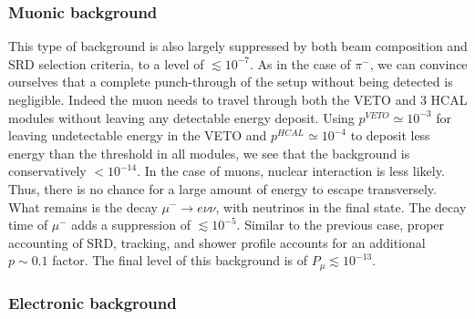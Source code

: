 \subsubsection{Muonic background}
\label{ch3:sec:bkg:inv:muon}

This type of background is also largely suppressed by both beam composition and SRD selection criteria, to a level of
$\lesssim 10^{-7}$. As in the case of $\pi^-$, we can convince ourselves that a complete punch-through of the setup without being detected is negligible. Indeed the muon needs to travel through both the VETO and 3 HCAL modules without leaving any detectable energy deposit. Using $p^{VETO} \simeq 10^{-3}$ for leaving undetectable energy in the VETO and $p^{HCAL} \simeq 10^{-4}$ to deposit less energy than the threshold in all modules, we see that the background is conservatively $< 10^{-14}$. In the case of muons, nuclear interaction is less likely. Thus, there is no chance for a large amount of energy to escape transversely. What remains is the decay $\mu^- \rightarrow e\nu\nu$, with neutrinos in the final state. The decay time of $\mu^-$ adds a suppression of $\lesssim 10^{-5}$. Similar to the previous case, proper accounting of SRD, tracking, and shower profile accounts for an additional $p\sim 0.1$ factor. The final level of this background is of $P_{\mu} \lesssim 10^{-13}$.

\subsubsection{Electronic background}
\label{ch3:sec:bkg:inv:elec}

